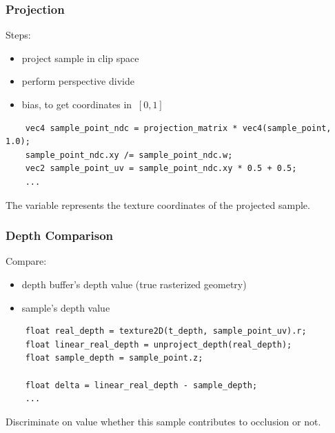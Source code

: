\documentclass{beamer}
\newcommand{\redtext}[1]{\textcolor{myred}{#1}}
\begin{document}
\begin{frame}[fragile]
\frametitle{Projection}
Steps:
\begin{itemize}
    \item \redtext{project} sample in clip space
    \item perform \redtext{perspective divide}
    \item \redtext{bias}, to get coordinates in $\ [0,1] $
\end{itemize}

\begin{verbatim}
    vec4 sample_point_ndc = projection_matrix * vec4(sample_point, 1.0);
    sample_point_ndc.xy /= sample_point_ndc.w;
    vec2 sample_point_uv = sample_point_ndc.xy * 0.5 + 0.5;
    ...
\end{verbatim}

The variable  represents the \redtext{texture coordinates} of the projected sample.

\end{frame}

\begin{frame}[fragile]
\frametitle{Depth Comparison}
\redtext{Compare}:
\begin{itemize}
    \item \redtext{depth buffer}'s depth value (true rasterized geometry)
    \item \redtext{sample}'s depth value
\end{itemize}

\begin{verbatim}
    float real_depth = texture2D(t_depth, sample_point_uv).r;
    float linear_real_depth = unproject_depth(real_depth);
    float sample_depth = sample_point.z;
    
    float delta = linear_real_depth - sample_depth;
    ...
\end{verbatim}

Discriminate on  value whether this sample contributes to occlusion or not.
\end{frame}
\end{document}
